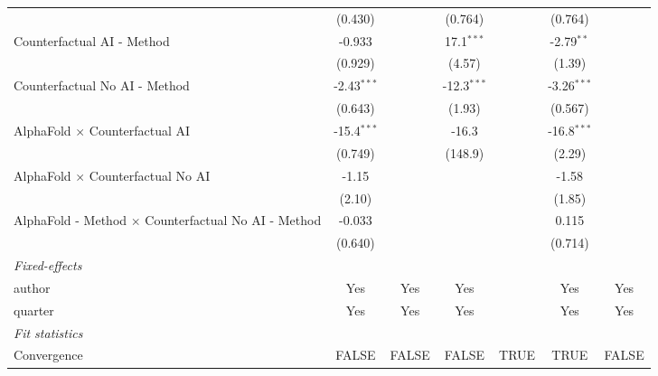 \begin{tabular}{lcccccc}
                                                              & (0.430)       &             & (0.764)       &      & (0.764)       &   \\   
   Counterfactual AI - Method                                 & -0.933        &             & 17.1$^{***}$  &      & -2.79$^{**}$  &   \\   
                                                              & (0.929)       &             & (4.57)        &      & (1.39)        &   \\   
   Counterfactual No AI - Method                              & -2.43$^{***}$ &             & -12.3$^{***}$ &      & -3.26$^{***}$ &   \\   
                                                              & (0.643)       &             & (1.93)        &      & (0.567)       &   \\   
   AlphaFold $\times$ Counterfactual AI                       & -15.4$^{***}$ &             & -16.3         &      & -16.8$^{***}$ &   \\   
                                                              & (0.749)       &             & (148.9)       &      & (2.29)        &   \\   
   AlphaFold $\times$ Counterfactual No AI                    & -1.15         &             &               &      & -1.58         &   \\   
                                                              & (2.10)        &             &               &      & (1.85)        &   \\   
   AlphaFold - Method $\times$ Counterfactual No AI - Method  & -0.033        &             &               &      & 0.115         &   \\   
                                                              & (0.640)       &             &               &      & (0.714)       &   \\   
   \midrule
   \emph{Fixed-effects}\\
   author                                                     & Yes           & Yes         & Yes           &      & Yes           & Yes\\  
   quarter                                                    & Yes           & Yes         & Yes           &      & Yes           & Yes\\  
   \midrule
   \emph{Fit statistics}\\
   Convergence                                                &FALSE          & FALSE       & FALSE         & TRUE & TRUE          & FALSE\\  

\end{tabular}
